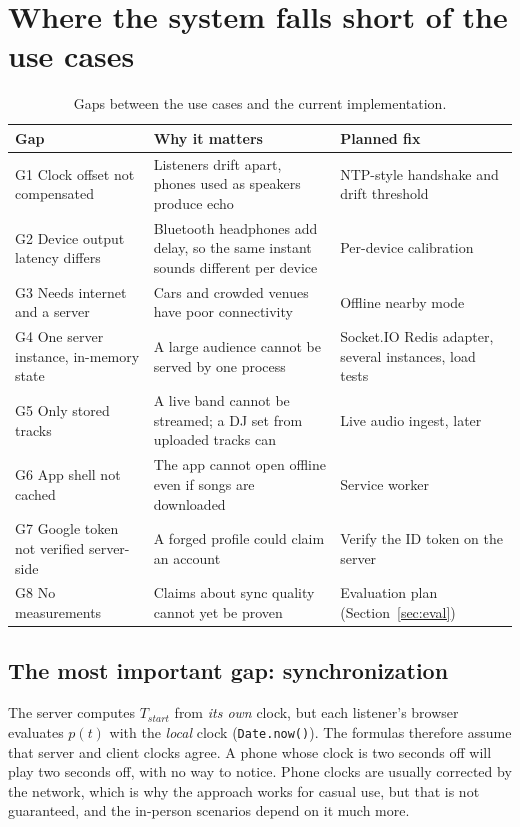 \documentclass[11pt,a4paper]{article}
\begin{document}
\section{Where the system falls short of the use cases}\label{sec:gaps}
\begin{table}[htbp]
\centering
\caption{Gaps between the use cases and the current implementation.}
\label{tab:gaps}
\footnotesize
\begin{tabularx}{\textwidth}{@{}l>{\raggedright\arraybackslash}X>{\raggedright\arraybackslash}X@{}}
\toprule
\textbf{Gap} & \textbf{Why it matters} & \textbf{Planned fix} \\
\midrule
G1 Clock offset not compensated & Listeners drift apart, phones used as speakers produce echo & NTP-style handshake and drift threshold \\
G2 Device output latency differs & Bluetooth headphones add delay, so the same instant sounds different per device & Per-device calibration \\
G3 Needs internet and a server & Cars and crowded venues have poor connectivity & Offline nearby mode \\
G4 One server instance, in-memory state & A large audience cannot be served by one process & Socket.IO Redis adapter, several instances, load tests \\
G5 Only stored tracks & A live band cannot be streamed; a DJ set from uploaded tracks can & Live audio ingest, later \\
G6 App shell not cached & The app cannot open offline even if songs are downloaded & Service worker \\
G7 Google token not verified server-side & A forged profile could claim an account & Verify the ID token on the server \\
G8 No measurements & Claims about sync quality cannot yet be proven & Evaluation plan (Section~\ref{sec:eval}) \\
\bottomrule
\end{tabularx}
\end{table}

\subsection{The most important gap: synchronization}\label{sec:sync}
The server computes $T_{start}$ from \emph{its own} clock, but each listener's browser
evaluates $p(t)$ with the \emph{local} clock (\texttt{Date.now()}). The formulas therefore
assume that server and client clocks agree. A phone whose clock is two seconds off will
play two seconds off, with no way to notice. Phone clocks are usually corrected by the
network, which is why the approach works for casual use, but that is not guaranteed, and
the in-person scenarios depend on it much more.
\end{document}
